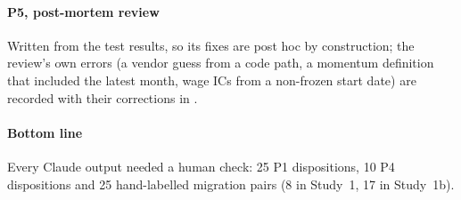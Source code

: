 \paragraph{P5, post-mortem review} Written from the test results, so its fixes are post hoc by construction; the review's own errors (a vendor guess from a code path, a momentum definition that included the latest month, wage ICs from a non-frozen start date) are recorded with their corrections in .

\paragraph{Bottom line} Every Claude output needed a human check: 25 P1 dispositions, 10 P4 dispositions and 25 hand-labelled migration pairs (8 in Study~1, 17 in Study~1b). %

